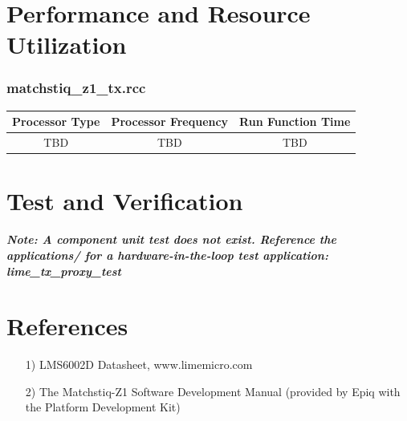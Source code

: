 \documentclass{article}
\def\comp{matchstiq\_z1\_tx}
\begin{document}
\section*{Performance and Resource Utilization}
\subsubsection*{\comp.rcc}
\begin{scriptsize}
	\begin{tabular}{|c|c|c|}
		\hline
		\rowcolor{blue}
		Processor Type & Processor Frequency & Run Function Time \\
		\hline
		TBD            & TBD                 & TBD               \\
		\hline
	\end{tabular}
\end{scriptsize}

\section*{Test and Verification}

\textit{\textbf{Note: A component unit test does not exist.  Reference the applications/ for a hardware-in-the-loop test application: lime\_tx\_proxy\_test}}

\section*{References}
\begin{itemize}
	\item[1)] LMS6002D Datasheet, www.limemicro.com
	\item[2)] The Matchstiq-Z1 Software Development Manual (provided by Epiq with the Platform Development Kit)
\end{itemize}
\end{document}
